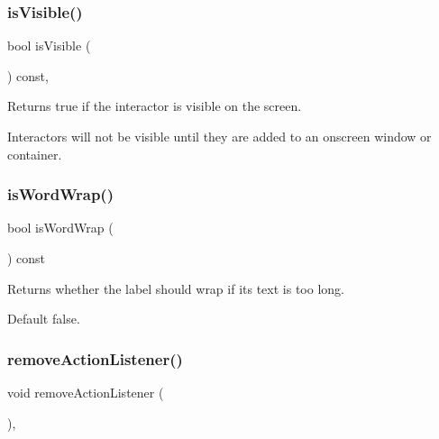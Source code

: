 \subsubsection{\texorpdfstring{is\+Visible()}{isVisible()}}
{\footnotesize\ttfamily bool is\+Visible (\begin{DoxyParamCaption}{ }\end{DoxyParamCaption}) const\hspace{0.3cm}{\ttfamily [virtual]}, {\ttfamily [inherited]}}



Returns true if the interactor is visible on the screen. 

Interactors will not be visible until they are added to an onscreen window or container. \mbox{\label{classsgl_1_1GLabel_a52b12a2d7b5e2fec7478e3715c98c315}} 
\subsubsection{\texorpdfstring{is\+Word\+Wrap()}{isWordWrap()}}
{\footnotesize\ttfamily bool is\+Word\+Wrap (\begin{DoxyParamCaption}{ }\end{DoxyParamCaption}) const\hspace{0.3cm}{\ttfamily [virtual]}}



Returns whether the label should wrap if its text is too long. 

Default false. \mbox{\label{classsgl_1_1GInteractor_ab7fe7a876367b87cf7202f947f1d05e4}} 
\subsubsection{\texorpdfstring{remove\+Action\+Listener()}{removeActionListener()}}
{\footnotesize\ttfamily void remove\+Action\+Listener (\begin{DoxyParamCaption}{ }\end{DoxyParamCaption})\hspace{0.3cm}{\ttfamily [virtual]}, {\ttfamily [inherited]}}



